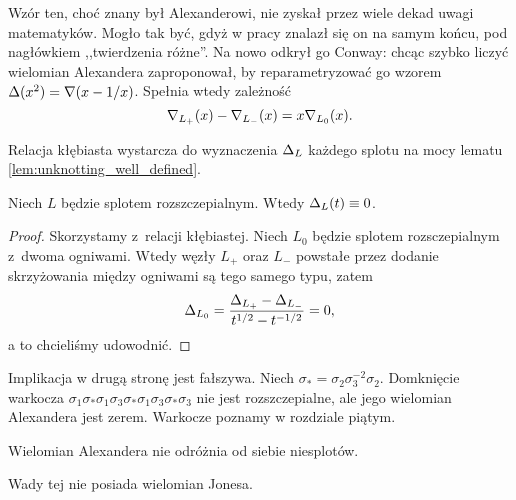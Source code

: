 Wzór ten, choć znany był Alexanderowi, nie zyskał przez wiele dekad uwagi matematyków.
%
Mogło tak być, gdyż w pracy \cite{alexander28} znalazł się on na samym końcu, pod nagłówkiem ,,twierdzenia różne''.
Na nowo odkrył go Conway: chcąc szybko liczyć wielomian Alexandera zaproponował, by reparametryzować go wzorem $\Delta(x^2) = \nabla(x - 1/x)$.
Spełnia wtedy zależność
\begin{equation}
    \nabla_{L_+}(x)- \nabla_{L_-}(x) = x \nabla_{L_0}(x).
\end{equation}

Relacja kłębiasta wystarcza do wyznaczenia $\Delta_L$ każdego splotu na mocy lematu \ref{lem:unknotting_well_defined}.

\begin{proposition}
    \label{prp:alexander_unlinks}
    Niech $L$ będzie splotem rozszczepialnym.
    Wtedy $\Delta_L(t) \equiv 0$.
\end{proposition}

\begin{proof}
    Skorzystamy z~relacji kłębiastej.
    Niech $L_0$ będzie splotem rozsczepialnym z~dwoma ogniwami.
    Wtedy węzły $L_+$ oraz $L_-$ powstałe przez dodanie skrzyżowania między ogniwami są tego samego typu, zatem
    \begin{equation}
        \Delta_{L_0} = \frac{\Delta_{L_+} - \Delta_{L_-}}{t^{1/2} - t^{-1/2}} = 0,
    \end{equation}
    a to chcieliśmy udowodnić.
\end{proof}

Implikacja w drugą stronę jest fałszywa.
Niech $\sigma_* = \sigma_{2} \sigma_{3}^{-2} \sigma_{2}$.
Domknięcie warkocza $\sigma_{1} \sigma_* \sigma_{1} \sigma_{3} \sigma_* \sigma_{1} \sigma_{3} \sigma_* \sigma_{3}$ nie jest rozszczepialne, ale jego wielomian Alexandera jest zerem.
Warkocze poznamy w rozdziale piątym.

\begin{corollary}
    Wielomian Alexandera nie odróżnia od siebie niesplotów.
\end{corollary}

Wady tej nie posiada wielomian Jonesa.


